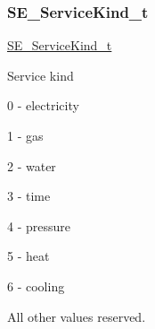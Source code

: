 \subsubsection{\texorpdfstring{S\+E\+\_\+\+Service\+Kind\+\_\+t}{SE\_ServiceKind\_t}}
{\footnotesize\ttfamily \hyperlink{group__ServiceKind_ga19a788255c7eeda579474fc6f3cc0810}{S\+E\+\_\+\+Service\+Kind\+\_\+t}}

Service kind

0 -\/ electricity

1 -\/ gas

2 -\/ water

3 -\/ time

4 -\/ pressure

5 -\/ heat

6 -\/ cooling

All other values reserved. 